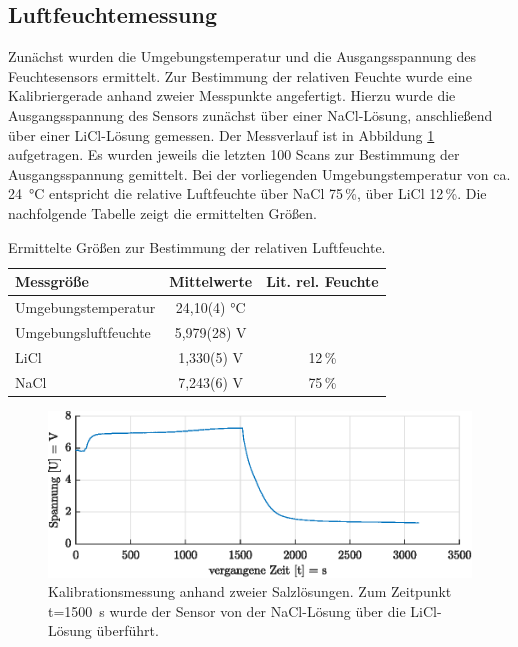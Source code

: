 \subsection{Luftfeuchtemessung}
Zunächst wurden die Umgebungstemperatur und die Ausgangsspannung des Feuchtesensors ermittelt. Zur Bestimmung der relativen Feuchte wurde eine Kalibriergerade anhand zweier Messpunkte angefertigt. Hierzu wurde die Ausgangsspannung des Sensors zunächst über einer NaCl-Lösung, anschließend über einer LiCl-Lösung gemessen. Der Messverlauf ist in Abbildung \ref{fig:cal} aufgetragen. Es wurden jeweils die letzten 100 Scans zur Bestimmung der Ausgangsspannung gemittelt. Bei der vorliegenden Umgebungstemperatur von ca. \SI{24}{\celsius} entspricht die relative Luftfeuchte über NaCl 75\,\%, über LiCl 12\,\%. Die nachfolgende Tabelle zeigt die ermittelten Größen.
\begin{table}[H]
	\centering
	\caption{Ermittelte Größen zur Bestimmung der relativen Luftfeuchte.}
	\begin{tabular}{lS[separate-uncertainty,table-parse-only,table-figures-uncertainty = 1]c}
		\label{tab:amb}
		
		\textbf{Messgröße} & \textbf{Mittelwerte} & \textbf{Lit. rel. Feuchte}\\
		\hline
		Umgebungstemperatur & 24,10(4) \si{\celsius} &\\
		Umgebungsluftfeuchte & 5,979(28) \si{\volt} & \\
		LiCl & 1,330(5) \si{\volt} & 12\,\%\\
		NaCl & 7,243(6) \si{\volt} & 75\,\%
	\end{tabular}
\end{table}

\begin{figure}[H]
	\centering
	\includegraphics[width=\textwidth]{../DATA/Messreihe_Feuchtekalibration.eps}
	\caption[Kalibrationsmessung]{Kalibrationsmessung anhand zweier Salzlösungen. Zum Zeitpunkt t=\SI{1500}{\second} wurde der Sensor von der NaCl-Lösung über die LiCl-Lösung überführt.}
	\label{fig:cal}
\end{figure}

